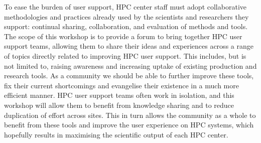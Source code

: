 \documentclass[a4paper,10pt]{article}
\begin{document}
To ease the burden of user support, HPC center staff must adopt collaborative
methodologies and practices already used by the scientists and researchers
they support: continual sharing, collaboration, and evaluation of methods and tools.
The scope of this workshop is to provide a forum to bring together HPC user support
teams, allowing them to share their ideas and experiences across a range of topics
directly related to improving HPC user support. This includes, but is not limited to, 
raising awareness and increasing uptake of existing production and research tools.
As a community we should be able to further improve these tools, fix their current
shortcomings and evangelise their existence in a much more efficient manner. HPC user 
support teams often work in isolation, and this workshop will allow them to benefit 
from knowledge sharing and to reduce duplication of effort across sites.
This in turn allows the community as a whole to benefit from these tools and improve
the user experience on HPC systems, which hopefully results in maximising the 
scientific output of each HPC center.
\end{document}
